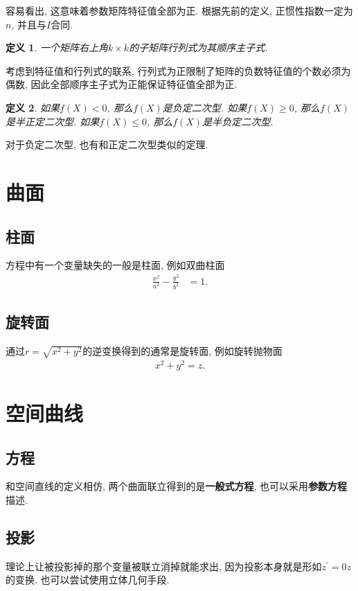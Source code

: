 \documentclass[UTF8,a4paper,11pt]{ctexart}
\newtheorem{definition}{定义}
\begin{document}
    容易看出, 这意味着参数矩阵特征值全部为正.
    根据先前的定义, 正惯性指数一定为$n$,
    并且与$I$合同.

    \begin{definition}
      一个矩阵右上角$k\times k$的子矩阵行列式为其顺序主子式.
    \end{definition}

    考虑到特征值和行列式的联系,
    行列式为正限制了矩阵的负数特征值的个数必须为偶数,
    因此全部顺序主子式为正能保证特征值全部为正.

    \begin{definition}
      如果$f\left(X\right)<0$, 那么$f\left(X\right)$是负定二次型.
      如果$f\left(X\right)\ge 0$, 那么$f\left(X\right)$是半正定二次型.
      如果$f\left(X\right)\le 0$, 那么$f\left(X\right)$是半负定二次型.
    \end{definition}

    对于负定二次型, 也有和正定二次型类似的定理.

  \section{曲面}
    \subsection{柱面}
      方程中有一个变量缺失的一般是柱面, 例如双曲柱面
      \[
      \begin{aligned}
        \frac{x^{2}}{a^{2}}-\frac{y^{2}}{b^{2}}&=1
      .\end{aligned}
      \]
    \subsection{旋转面}
      通过$r=\sqrt{x^{2}+y^{2}}$的逆变换得到的通常是旋转面, 例如旋转抛物面
      \[
      \begin{aligned}
        x^{2}+y^{2}=z
      .\end{aligned}
      \]
  \section{空间曲线}
    \subsection{方程}
      和空间直线的定义相仿, 
      两个曲面联立得到的是\textbf{一般式方程},
      也可以采用\textbf{参数方程}描述.

    \subsection{投影}
      理论上让被投影掉的那个变量被联立消掉就能求出,
      因为投影本身就是形如$z^{\prime}=0z$的变换.
      也可以尝试使用立体几何手段.
\end{document}
